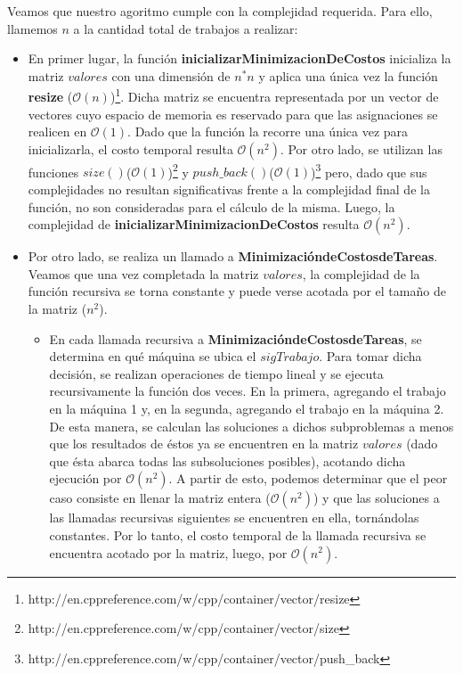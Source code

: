 Veamos que nuestro agoritmo cumple con la complejidad requerida. Para ello, llamemos $n$ a la cantidad total de trabajos a realizar:
\begin{itemize}
\item En primer lugar, la función \textbf{inicializarMinimizacionDeCostos} inicializa la matriz $valores$ con una dimensión de $n^*n$ y aplica una única vez la función \textbf{resize} ($\mathcal{O}(n)$)\footnote{http://en.cppreference.com/w/cpp/container/vector/resize}. Dicha matriz se encuentra representada por un vector de vectores cuyo espacio de memoria es reservado para que las asignaciones se realicen en $\mathcal{O}(1)$. Dado que la función la recorre una única vez para inicializarla, el costo temporal resulta $\mathcal{O}(n^{2})$. Por otro lado, se utilizan las funciones $size()$($\mathcal{O}(1)$)\footnote{http://en.cppreference.com/w/cpp/container/vector/size} y $push\_back()$($\mathcal{O}(1)$)\footnote{http://en.cppreference.com/w/cpp/container/vector/push\_back} pero, dado que sus complejidades no resultan significativas frente a la complejidad final de la función, no son consideradas para el cálculo de la misma. Luego, la complejidad de \textbf{inicializarMinimizacionDeCostos} resulta $\mathcal{O}(n^{2})$.

\item Por otro lado, se realiza un llamado a \textbf{MinimizacióndeCostosdeTareas}. Veamos que una vez completada la matriz $valores$, la complejidad de la función recursiva se torna constante y puede verse acotada por el tamaño de la matriz ($n^{2}$).
\begin{itemize}
\item En cada llamada recursiva a \textbf{MinimizacióndeCostosdeTareas}, se determina en qué máquina se ubica el $sigTrabajo$. Para tomar dicha decisión, se realizan operaciones de tiempo lineal y se ejecuta recursivamente la función dos veces. En la primera, agregando el trabajo en la máquina 1 y, en la segunda, agregando el trabajo en la máquina 2. De esta manera, se calculan las soluciones a dichos subproblemas a menos que los resultados de éstos ya se encuentren en la matriz $valores$ (dado que ésta abarca todas las subsoluciones posibles), acotando dicha ejecución por $\mathcal{O}(n^{2})$. A partir de esto, podemos determinar que el peor caso consiste en llenar la matriz entera ($\mathcal{O}(n^{2})$) y que las soluciones a las llamadas recursivas siguientes se encuentren en ella, tornándolas constantes. Por lo tanto, el costo temporal de la llamada recursiva se encuentra acotado por la matriz, luego, por $\mathcal{O}(n^{2})$. 


\end{itemize}
\end{itemize}
